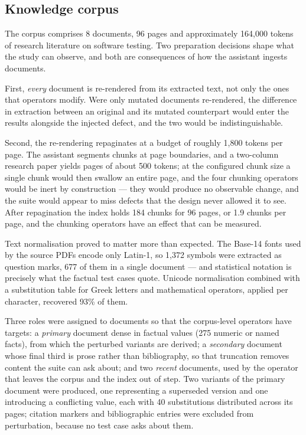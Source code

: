 \documentclass[a4paper,fleqn]{cas-dc}
\begin{document}
\subsection{Knowledge corpus}
\label{sec:corpus}

The corpus comprises 8 documents, 96 pages and approximately 164,000 tokens of
research literature on software testing. Two preparation decisions shape what
the study can observe, and both are consequences of how the assistant ingests
documents.

First, \emph{every} document is re-rendered from its extracted text, not only
the ones that operators modify. Were only mutated documents re-rendered, the
difference in extraction between an original and its mutated counterpart would
enter the results alongside the injected defect, and the two would be
indistinguishable.

Second, the re-rendering repaginates at a budget of roughly 1,800 tokens per
page. The assistant segments chunks at page boundaries, and a two-column
research paper yields pages of about 500 tokens; at the configured chunk size a
single chunk would then swallow an entire page, and the four chunking operators
would be inert by construction --- they would produce no observable change, and
the suite would appear to miss defects that the design never allowed it to see.
After repagination the index holds 184 chunks for 96 pages, or 1.9 chunks per
page, and the chunking operators have an effect that can be measured.

Text normalisation proved to matter more than expected. The Base-14 fonts used
by the source PDFs encode only Latin-1, so 1,372 symbols were extracted as
question marks, 677 of them in a single document --- and statistical notation
is precisely what the factual test cases quote. Unicode normalisation combined
with a substitution table for Greek letters and mathematical operators, applied
per character, recovered 93\% of them.

Three roles were assigned to documents so that the corpus-level operators have
targets: a \emph{primary} document dense in factual values (275 numeric or
named facts), from which the perturbed variants are derived; a \emph{secondary}
document whose final third is prose rather than bibliography, so that
truncation removes content the suite can ask about; and two \emph{recent}
documents, used by the operator that leaves the corpus and the index out of
step. Two variants of the primary document were produced, one representing a
superseded version and one introducing a conflicting value, each with 40
substitutions distributed across its pages; citation markers and bibliographic
entries were excluded from perturbation, because no test case asks about them.
\end{document}
